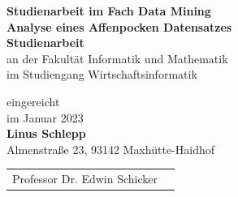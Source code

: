     \begin{center}
        \vspace*{4cm} %
        \Large
	    \textbf{Studienarbeit im Fach Data Mining}\\ %
        \large
        \textbf{Analyse eines Affenpocken Datensatzes}\\ %

        \vspace*{2cm} %
        \textbf{Studienarbeit}\\ %
        \vspace*{1cm}
    \large
        an der Fakultät Informatik und Mathematik\\
        im Studiengang Wirtschaftsinformatik
    \\ %
    
    \vspace*{2cm} 
    \normalsize
        \begin{center}
            eingereicht\\
            im Januar 2023\\
        \textbf{Linus Schlepp}\\
        Almenstraße 23, 93142 Maxhütte-Haidhof
            
            
        \end{center}
        \vspace*{2cm}      
        \begin{table}[H]
            \centering
            \begin{tabular}{ll}
                Professor Dr. Edwin Schicker \\
              
            \end{tabular}%
        \end{table}%
        
        
        
    \end{center}
    
\pagebreak

